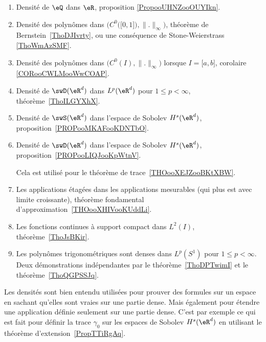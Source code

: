          \label{THEooPUIIooLDPUuq}
\begin{enumerate}
	\item
	      Densité de \( \eQ\) dans \( \eR\), proposition \ref{PropooUHNZooOUYIkn}.
	\item
	      Densité des polynômes dans \( \Big( C^0\big( \mathopen[ 0 , 1 \mathclose] \big),\| . \|_{\infty} \Big)\), théorème de Bernstein~\ref{ThoDJIvrty}, ou une conséquence de Stone-Weierstrass \ref{ThoWmAzSMF}.
	\item
	      Densité des polynômes dans \( \big( C^0(I),\| . \|_{\infty} \big)\) lorsque \( I=\mathopen[ a , b \mathclose]\), corolaire \ref{CORooCWLMooWwCOAP}.
	\item
	      Densité de \( \swD(\eR^d)\) dans \( L^p(\eR^d)\) pour \( 1\leq p<\infty\), théorème~\ref{ThoILGYXhX}.
	\item
	      Densité de \( \swS(\eR^d)\) dans l'espace de Sobolev \( H^s(\eR^d)\), proposition~\ref{PROPooMKAFooKDNTbO}.

	\item
	      Densité de \( \swD(\eR^d)\) dans l'espace de Sobolev \( H^s(\eR^d)\), proposition~\ref{PROPooLIQJooKpWtnV}.

	      Cela est utilisé pour le théorème de trace~\ref{THOooXEJZooBKtXBW}.
	\item
	      Les applications étagées dans les applications mesurables (qui plus est avec limite croissante), théorème fondamental d'approximation~\ref{THOooXHIVooKUddLi}.
	\item
	      Les fonctions continues à support compact dans \( L^2(I)\), théorème~\ref{ThoJsBKir}.
	\item
	      Les polynômes trigonométriques sont denses dans \( L^p(S^1)\) pour \( 1\leq p<\infty\). Deux démonstrations indépendantes par le théorème~\ref{ThoDPTwimI} et le théorème~\ref{ThoQGPSSJq}.
\end{enumerate}
Les densités sont bien entendu utilisées pour prouver des formules sur un espace en sachant qu'elles sont vraies sur une partie dense. Mais également pour étendre une application définie seulement sur une partie dense. C'est par exemple ce qui est fait pour définir la trace \( \gamma_0\) sur les espaces de Sobolev \( H^s(\eR^d)\) en utilisant le théorème d'extension~\ref{PropTTiRgAq}.

